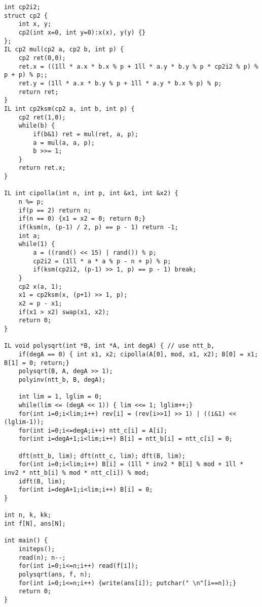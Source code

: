 \documentclass[UTF8]{ctexart}
\begin{document}
\begin{framed}
\begin{lstlisting}
int cp2i2;
struct cp2 {
    int x, y;
    cp2(int x=0, int y=0):x(x), y(y) {}
};
IL cp2 mul(cp2 a, cp2 b, int p) {
    cp2 ret(0,0);
    ret.x = ((1ll * a.x * b.x % p + 1ll * a.y * b.y % p * cp2i2 % p) % p + p) % p;;
    ret.y = (1ll * a.x * b.y % p + 1ll * a.y * b.x % p) % p;
    return ret;
}
IL int cp2ksm(cp2 a, int b, int p) {
    cp2 ret(1,0);
    while(b) {
        if(b&1) ret = mul(ret, a, p);
        a = mul(a, a, p);
        b >>= 1;
    }
    return ret.x;
}

IL int cipolla(int n, int p, int &x1, int &x2) {
    n %= p;
    if(p == 2) return n;
    if(n == 0) {x1 = x2 = 0; return 0;}
    if(ksm(n, (p-1) / 2, p) == p - 1) return -1;
    int a;
    while(1) {
        a = ((rand() << 15) | rand()) % p;
        cp2i2 = (1ll * a * a % p - n + p) % p;
        if(ksm(cp2i2, (p-1) >> 1, p) == p - 1) break;
    }
    cp2 x(a, 1);
    x1 = cp2ksm(x, (p+1) >> 1, p);
    x2 = p - x1;
    if(x1 > x2) swap(x1, x2);
    return 0;
}

IL void polysqrt(int *B, int *A, int degA) { // use ntt_b, 
    if(degA == 0) { int x1, x2; cipolla(A[0], mod, x1, x2); B[0] = x1; B[1] = 0; return;}
    polysqrt(B, A, degA >> 1);
    polyinv(ntt_b, B, degA);

    int lim = 1, lglim = 0;
    while(lim <= (degA << 1)) { lim <<= 1; lglim++;}
    for(int i=0;i<lim;i++) rev[i] = (rev[i>>1] >> 1) | ((i&1) << (lglim-1));
    for(int i=0;i<=degA;i++) ntt_c[i] = A[i];
    for(int i=degA+1;i<lim;i++) B[i] = ntt_b[i] = ntt_c[i] = 0;

    dft(ntt_b, lim); dft(ntt_c, lim); dft(B, lim);
    for(int i=0;i<lim;i++) B[i] = (1ll * inv2 * B[i] % mod + 1ll * inv2 * ntt_b[i] % mod * ntt_c[i]) % mod;
    idft(B, lim);
    for(int i=degA+1;i<lim;i++) B[i] = 0;
}

int n, k, kk;
int f[N], ans[N];

int main() {
    initeps();
    read(n); n--;
    for(int i=0;i<=n;i++) read(f[i]);
    polysqrt(ans, f, n);
    for(int i=0;i<=n;i++) {write(ans[i]); putchar(" \n"[i==n]);}
    return 0;
}
\end{lstlisting}
\end{framed}
\end{document}
